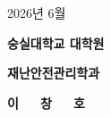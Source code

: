
\vspace*{3.0cm}

\begin{center}
  {\fontsize{14}{20}\selectfont 2026년 6월}\par

  \vspace{2.0cm} %
  {\fontsize{18}{22}\selectfont\bfseries 숭실대학교 대학원}\par

  \vspace{1.0cm} %
  {\fontsize{14}{20}\selectfont\bfseries 재난안전관리학과}\par

  \vspace{1.0cm} %
  {\fontsize{14}{20}\selectfont\bfseries 이\ \ \ 창\ \ \ 호}\par

\end{center}

\endgroup

\clearpage
